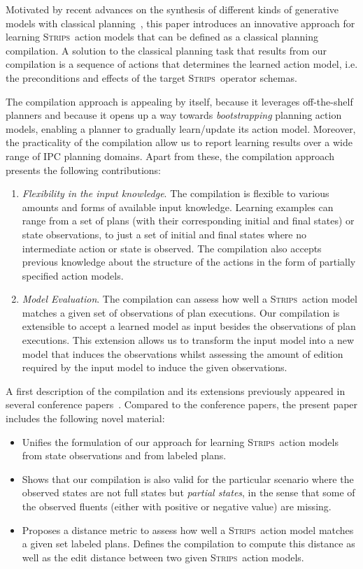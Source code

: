 \documentclass[3p,times]{elsarticle}
\newcommand{\strips}{\textsc{Strips}}     %
\begin{document}
Motivated by recent advances on the synthesis of different kinds of generative models with classical planning~\cite{bonet2009automatic,segovia2016generalized,segovia2016hierarchical,segovia2017generating}, this paper introduces an innovative approach for learning \strips\ action models that can be defined as a classical planning compilation. A solution to the classical planning task that results from our compilation is a sequence of actions that determines the learned action model, i.e. the preconditions and effects of the target \strips\ operator schemas.

The compilation approach is appealing by itself, because it leverages off-the-shelf planners and because it opens up a way towards \emph{bootstrapping} planning action models, enabling a planner to gradually learn/update its action model. Moreover, the practicality of the compilation allow us to report learning results over a wide range of IPC planning domains. Apart from these, the compilation approach presents the following contributions:
\begin{enumerate}
\item {\em Flexibility in the input knowledge}. The compilation is flexible to various amounts and forms of available input knowledge. Learning examples can range from a set of plans (with their corresponding initial and final states) or state observations, to just a set of initial and final states where no intermediate action or state is observed. The compilation also accepts previous knowledge about the structure of the actions in the form of partially specified action models. 

\item {\em Model Evaluation}. The compilation can assess how well a \strips\ action model matches a given set of observations of plan executions. Our compilation is extensible to accept a learned model as input besides the observations of plan executions. This extension allows us to transform the input model into a new model that induces the observations whilst assessing the amount of edition required by the input model to induce the given observations. 
\end{enumerate}

A first description of the compilation and its extensions previously appeared in several conference papers~\cite{aineto2018learning}. Compared to the conference papers, the present paper includes the following novel material:
\begin{itemize}
\item Unifies the formulation of our approach for learning \strips\ action models from state observations and from labeled plans.
\item Shows that our compilation is also valid for the particular scenario where the observed states are not full states but {\em partial states}, in the sense that some of the observed fluents (either with positive or negative value) are missing.
\item Proposes a distance metric to assess how well a \strips\ action model matches a given set labeled plans. Defines the compilation to compute this distance as well as the edit distance between two given \strips\ action models.
\end{itemize}  
\end{document}
